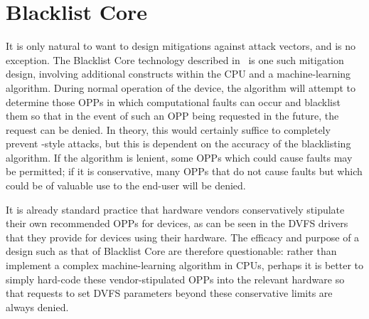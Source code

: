 \section{Blacklist Core}

It is only natural to want to design mitigations against attack vectors, and
\clkscrew{} is no exception. The Blacklist Core technology described
in~\cite{blacklistCore} is one such mitigation design, involving additional constructs
within the CPU and a machine-learning algorithm. During normal operation of the
device, the algorithm will attempt to determine those OPPs in which
computational faults can occur and blacklist them so that in the event of such
an OPP being requested in the future, the request can be denied. In theory, this
would certainly suffice to completely prevent \clkscrew{}-style attacks, but
this is dependent on the accuracy of the blacklisting algorithm. If the
algorithm is lenient, some OPPs which could cause faults may be permitted; if
it is conservative, many OPPs that do not cause faults but which could be of
valuable use to the end-user will be denied.

It is already standard practice that hardware vendors conservatively stipulate
their own recommended OPPs for devices, as can be seen in the DVFS drivers that
they provide for devices using their hardware. The efficacy and purpose of a
design such as that of Blacklist Core are therefore questionable: rather than
implement a complex machine-learning algorithm in CPUs, perhaps it is better to
simply hard-code these vendor-stipulated OPPs into the relevant hardware so
that requests to set DVFS parameters beyond these conservative limits are always
denied.

